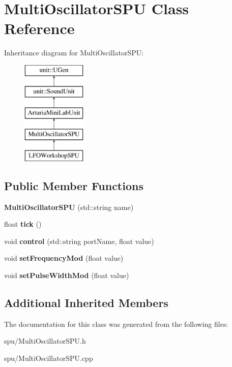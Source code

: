 \hypertarget{classMultiOscillatorSPU}{}\section{Multi\+Oscillator\+S\+PU Class Reference}
\label{classMultiOscillatorSPU}
Inheritance diagram for Multi\+Oscillator\+S\+PU\+:\begin{figure}[H]
\begin{center}
\leavevmode
\includegraphics[height=5.000000cm]{classMultiOscillatorSPU}
\end{center}
\end{figure}
\subsection*{Public Member Functions}
\begin{DoxyCompactItemize}
\item 
{\bfseries Multi\+Oscillator\+S\+PU} (std\+::string name)\hypertarget{classMultiOscillatorSPU_a3c7fc8e1067fb1b025551702344597a6}{}\label{classMultiOscillatorSPU_a3c7fc8e1067fb1b025551702344597a6}

\item 
float {\bfseries tick} ()\hypertarget{classMultiOscillatorSPU_ac5004f7b5bfa6025abee24b53abdd69f}{}\label{classMultiOscillatorSPU_ac5004f7b5bfa6025abee24b53abdd69f}

\item 
void {\bfseries control} (std\+::string port\+Name, float value)\hypertarget{classMultiOscillatorSPU_ab20794e0a79b779f35b36582cf4f65d0}{}\label{classMultiOscillatorSPU_ab20794e0a79b779f35b36582cf4f65d0}

\item 
void {\bfseries set\+Frequency\+Mod} (float value)\hypertarget{classMultiOscillatorSPU_a7040cf4388fe9bdaf624b707973241d0}{}\label{classMultiOscillatorSPU_a7040cf4388fe9bdaf624b707973241d0}

\item 
void {\bfseries set\+Pulse\+Width\+Mod} (float value)\hypertarget{classMultiOscillatorSPU_a42f7950c4fac230d97f43fa22587064e}{}\label{classMultiOscillatorSPU_a42f7950c4fac230d97f43fa22587064e}

\end{DoxyCompactItemize}
\subsection*{Additional Inherited Members}


The documentation for this class was generated from the following files\+:\begin{DoxyCompactItemize}
\item 
spu/Multi\+Oscillator\+S\+P\+U.\+h\item 
spu/Multi\+Oscillator\+S\+P\+U.\+cpp\end{DoxyCompactItemize}
